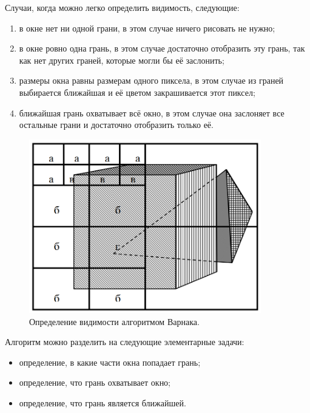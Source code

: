 Случаи, когда можно легко определить видимость, следующие:

\begin{enumerate}
\renewcommand{\labelenumi}{\alph{enumi})}
	\item в окне нет ни одной грани, в этом случае ничего рисовать не нужно;
	\item в окне ровно одна грань, в этом случае достаточно отобразить эту
грань, так как нет других граней, которые могли бы её заслонить;
	\item размеры окна равны размерам одного пиксела, в этом случае из
граней выбирается ближайшая и её цветом закрашивается этот
пиксел;
	\item ближайшая грань охватывает всё окно, в этом случае она заслоняет все остальные грани и достаточно отобразить только её. 
\end{enumerate}

\begin{figure}[H]
    \centering
    \includegraphics[width=0.9\textwidth]{img/varnak_algorithm_1.png}
    \caption{Определение видимости алгоритмом Варнака.}
    \label{fig:varnak_algorithm_1}
\end{figure}

Алгоритм можно разделить на следующие элементарные задачи:

\begin{itemize}
	\item определение, в какие части окна попадает грань;
	\item определение, что грань охватывает окно;
	\item определение, что грань является ближайшей.
\end{itemize}

